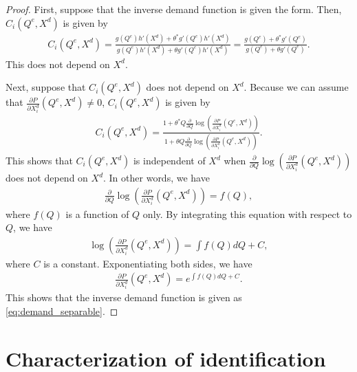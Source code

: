 \documentclass[11pt, a4paper]{article}
\theoremstyle{remark}
\begin{document}
\begin{proof}
    First, suppose that the inverse demand function is given the form.
    Then, $C_i(Q^e, X^{d})$ is given by
    \begin{align}
        C_i(Q^e, X^{d}) = \frac{g(Q^e)h'(X^{d}) + \theta^{*} g'(Q^e)h'(X^{d})}{g(Q^e)h'(X^{d}) + \theta g'(Q^e)h'(X^{d})} = \frac{g(Q^e) + \theta^{*} g'(Q^e)}{g(Q^e)+ \theta g'(Q^e)}. 
    \end{align}
    This does not depend on $X^{d}$.

    Next, suppose that $C_i(Q^e, X^{d})$ does not depend on $X^{d}$.
    Because we can assume that $\frac{\partial P}{\partial X^{d}_i}(Q^e, X^{d}) \ne 0$, $C_i(Q^e, X^{d})$ is given by
    \begin{align}
        C_i(Q^e, X^{d}) = \frac{1 + \theta^{*}Q\frac{\partial }{\partial Q} \log \left(\frac{\partial P}{\partial X^{d}_i}(Q^e, X^{d})\right)}{1 + \theta Q \frac{\partial }{\partial Q} \log \left(\frac{\partial P}{\partial X^{d}_i}(Q^e, X^{d})\right)}.
    \end{align}
    This shows that $C_i(Q^e, X^{d})$ is independent of $X^{d}$ when $\frac{\partial }{\partial Q} \log \left(\frac{\partial P}{\partial X^{d}_i}(Q^e, X^{d})\right)$ does not depend on $X^{d}$.
    In other words, we have
    \begin{align}
        \frac{\partial }{\partial Q} \log \left(\frac{\partial P}{\partial X^{d}_i}(Q^e, X^{d})\right) = f(Q),
    \end{align}
    where $f(Q)$ is a function of $Q$ only.
    By integrating this equation with respect to $Q$, we have
    \begin{align}
        \log \left(\frac{\partial P}{\partial X^{d}_i}(Q^e, X^{d})\right) = \int f(Q) dQ + C,
    \end{align}
    where $C$ is a constant.
    Exponentiating both sides, we have
    \begin{align}
        \frac{\partial P}{\partial X^{d}_i}(Q^e, X^{d}) = e^{\int f(Q) dQ + C}.
    \end{align}
    This shows that the inverse demand function is given as \eqref{eq:demand_separable}.
    

\end{proof}







\section{Characterization of identification}\label{sec:identification_characterization}
\end{document}
